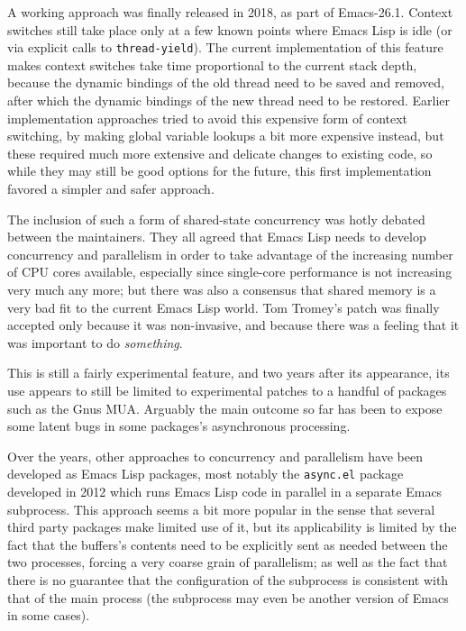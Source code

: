 \documentclass[format=acmsmall, review]{acmart}
\newcommand \Elisp {Emacs Lisp}
\begin{document}
A working approach was finally released in 2018, as part of Emacs-26.1.
Context switches still take place only at a few known points where \Elisp{}
is idle (or via explicit calls to \texttt{thread-yield}).  The current
implementation of this feature makes context switches take time proportional
to the current stack depth, because the dynamic bindings of the old thread
need to be saved and removed, after which the dynamic bindings of the new
thread need to be restored.  Earlier implementation approaches tried to
avoid this expensive form of context switching, by making global variable
lookups a bit more expensive instead, but these required much more extensive
and delicate changes to existing code, so while they may still be good
options for the future, this first implementation favored a simpler and
safer approach.

The inclusion of such a form of shared-state concurrency was hotly debated
between the maintainers.  They all agreed that \Elisp{} needs to develop
concurrency and parallelism in order to take advantage of the increasing
number of CPU cores available, especially since single-core performance is
not increasing very much any more; but there was also a consensus that
shared memory is a very bad fit to the current \Elisp{} world.  Tom Tromey's
patch was finally accepted only because it was non-invasive,
and because there was a feeling that it was important to do
\emph{something}.

This is still a fairly experimental feature, and two years after its
appearance, its use appears to still be limited to experimental patches to
a handful of packages such as the Gnus MUA.  Arguably the main outcome so
far has been to expose some latent bugs in some packages's
asynchronous processing.

Over the years, other approaches to concurrency and parallelism have been
developed as \Elisp{} packages, most notably the \texttt{async.el}
package~\cite{WiegleyAsync2019} developed in 2012 which runs \Elisp{} code
in parallel in a separate Emacs subprocess.  This approach seems a bit more
popular in the sense that several third party packages make limited use of
it, but its applicability is limited by the fact that the buffers's contents
need to be explicitly sent as needed between the two processes, forcing
a very coarse grain of parallelism; as well as the fact that there is no
guarantee that the configuration of the subprocess is consistent with that
of the main process (the subprocess may even be another version of Emacs in
some cases).
\end{document}
